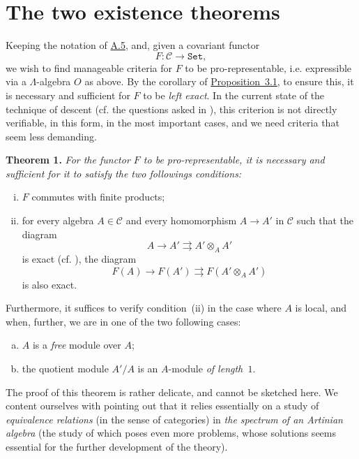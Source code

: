 \documentclass{article}
\newenvironment{itenv}[1]
  {\phantomsection\par\medskip\noindent\textbf{#1.}\itshape}
  {\medskip}
\renewcommand{\cal}[1]{{\mathcal{#1}}}
\newcommand{\Set}{\mathtt{Set}}
\newcommand{\oldpage}[1]{\marginpar{\footnotesize$\Big\vert$ \textit{p.~#1}}}
\begin{document}
\part{The two existence theorems}
\label{B}

Keeping the notation of \hyperref[A.5]{A.5}, and, given a covariant functor
\[
  F\colon \cal{C} \to \Set,
\]
we wish to find manageable criteria for $F$ to be pro-representable, i.e. expressible via a $\Lambda$-algebra $O$ as above.
By the corollary of \hyperref[A.3-proposition1]{Proposition~3.1}, to ensure this, it is necessary and sufficient for $F$ to be \emph{left exact}.
In the current state of the technique of descent (cf. the questions asked in \cite[p.~9]{3}), this criterion is not directly verifiable, in this form, in the most important cases, and we need criteria that seem less demanding.

\begin{itenv}{Theorem 1}
\label{B-theorem1}
  For the functor $F$ to be pro-representable, it is necessary and sufficient for it to satisfy the two followings conditions:
  \begin{enumerate}[(i)]
    \item $F$ commutes with finite products;
    \item for every algebra $A\in\cal{C}$ and every homomorphism $A\to A'$ in $\cal{C}$ such that the diagram
      \[
        A \to A' \rightrightarrows A'\otimes_A A'
      \]
      is exact (cf. \cite[A, Definition~1.2]{3}), the diagram
      \[
        F(A) \to F(A') \rightrightarrows F(A'\otimes_A A')
      \]
\oldpage{195-10}
      is also exact.
  \end{enumerate}

  Furthermore, it suffices to verify condition~(ii) in the case where $A$ is local, and when, further, we are in one of the two following cases:
  \begin{enumerate}[(a)]
    \item $A$ is a \emph{free} module over $A$;
    \item the quotient module $A'/A$ is an $A$-module \emph{of length~$1$}.
  \end{enumerate}
\end{itenv}

The proof of this theorem is rather delicate, and cannot be sketched here.
We content ourselves with pointing out that it relies essentially on a study of \emph{equivalence relations} (in the sense of categories) in \emph{the spectrum of an Artinian algebra} (the study of which poses even more problems, whose solutions seems essential for the further development of the theory).
\end{document}
